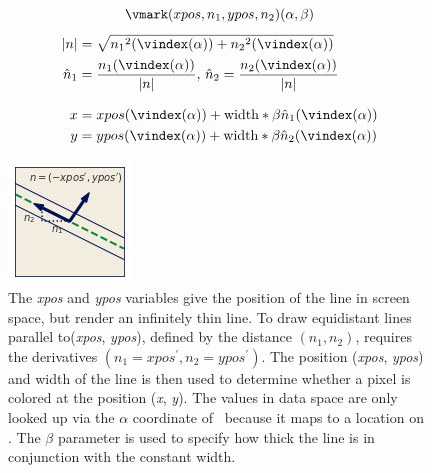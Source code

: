\documentclass[../main.tex]{subfiles}
\begin{document}
\begin{figure} [H]
    \begin{minipage}{.45\textwidth}
        \begingroup \leqnomode
        \begin{equation}
            \vmark(xpos, n_1, ypos, n_2 )(\alpha, \beta) 
            \label{eq:eq:math:artist:q:line}
        \end{equation} \endgroup
        \begin{align*}
            \lvert n \rvert &=\sqrt{{n_{1}}^2(\vindex(\alpha)) + {n_{2}}^2(\vindex(\alpha))} \\
            \hat{n}_{1} &= \frac{n_1(\vindex(\alpha))}{\lvert n \rvert}, \,\hat{n}_{2} = \frac{n_2(\vindex(\alpha))}{\lvert n \rvert} \\[.5\baselineskip]
            x &= xpos(\vindex(\alpha)) + \text{width}*\beta\hat{n}_1(\vindex(\alpha))  \\
            y &= ypos(\vindex(\alpha)) + \text{width}*\beta\hat{n}_2(\vindex(\alpha)) 
           \end{align*}
    \end{minipage}
    \begin{minipage}{.45\textwidth}
        \centering
        \includegraphics{figures/math/line_s.png}
    \end{minipage}
    \caption{The \textit{xpos} and \textit{ypos} variables give the position of the line in screen space, but render an infinitely thin line. To draw equidistant lines parallel to(\textit{xpos}, \textit{ypos}), defined by the distance  $(n_1, n_2)$, requires the derivatives $(n_{1} = xpos^{\prime}, n_{2} = ypos^{\prime})$. The position (\textit{xpos}, \textit{ypos}) and width of the line is then used to determine whether a pixel is colored at the position (\textit{x}, \textit{y}). The values in data space are only looked up via the $\alpha$ coordinate of \gbase\ because it maps to a location on \dbase. The $\beta$ parameter is used to specify how thick the line is in conjunction with the constant width. }
    \label{fig:math:artist:q:line:s}
\end{figure}
\end{document}
